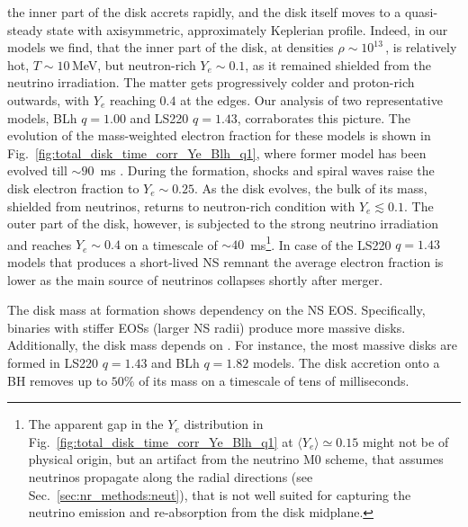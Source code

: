 the inner part of the disk accrets rapidly, and the disk itself moves to a 
quasi-steady state with axisymmetric, approximately Keplerian profile. 
%
Indeed, in our models we find, that the inner part of the \pmerg{} disk, 
at densities $\rho\sim10^{13}\,$\gcm{}, is relatively hot, $T\sim10\,$MeV, 
but neutron-rich $Y_e\sim0.1$, as it remained shielded from the neutrino irradiation. 
The matter gets progressively colder and proton-rich outwards, 
with $Y_e$ reaching $0.4$ at the edges.
%
Our analysis of two representative models, 
BLh $q=1.00$ and LS220 $q=1.43$, corraborates this picture. 
%
The evolution of the mass-weighted electron fraction 
for these models is shown in Fig.~\ref{fig:total_disk_time_corr_Ye_Blh_q1}, 
%
where former model has been evolved till ${\sim}90$~ms \pmerg{}. 
%
During the formation, shocks and spiral waves raise the disk electron fraction to
$Y_e\sim0.25$. As the disk evolves, the bulk of its mass, shielded from neutrinos, 
returns to neutron-rich condition with $Y_e\lesssim0.1$. The outer part of the disk, 
however, is subjected to the strong neutrino irradiation and reaches $Y_e\sim0.4$ on a 
timescale of ${\sim}40$~ms\footnote{
    The apparent gap in the $Y_e$ distribution in 
    Fig.~\ref{fig:total_disk_time_corr_Ye_Blh_q1} at $\langle Y_e \rangle \simeq 0.15$ 
    might not be of physical origin, but an artifact from the neutrino M0 scheme, 
    that assumes neutrinos propagate along the radial directions
    (see Sec.~\ref{sec:nr_methods:neut}), that is not well suited for capturing the 
    neutrino emission and re-absorption from the disk midplane.
}.
%
In case of the LS220 $q=1.43$ models that produces a short-lived \ac{NS} remnant 
the average electron fraction is lower as the main source of neutrinos collapses 
shortly after merger.



The disk mass at formation shows dependency on the \ac{NS} \ac{EOS}. Specifically, 
binaries with stiffer \acp{EOS} (larger \ac{NS} radii) produce more massive disks. 
Additionally, the disk mass depends on \mr{}. For instance, the most massive 
disks are formed in LS220 $q=1.43$ and BLh $q=1.82$ models.
%
The disk accretion onto a \ac{BH} removes up to 
$50\%$ of its mass on a timescale of tens of milliseconds.



